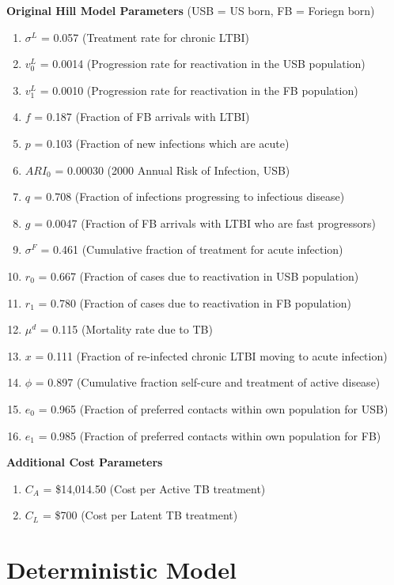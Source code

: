 \documentclass{article}[11pt]
\begin{document}
{\bf Original Hill Model Parameters}
(USB = US born, FB = Foriegn born)
\begin{enumerate} \itemsep 0em
\item{$\sigma^{L}$ = 0.057 (Treatment rate for chronic LTBI)}
\item{$v^{L}_{0}$   = 0.0014 (Progression rate for reactivation in the USB population)}
\item{$v^{L}_{1}$  = 0.0010 (Progression rate for reactivation in the FB population)}
\item{$f$                = 0.187 (Fraction of FB arrivals with LTBI)}
\item{$p$               = 0.103 (Fraction of new infections which are acute)}
\item{$ARI_{0}$     = 0.00030 (2000 Annual Risk of Infection, USB)}
\item{$q$               = 0.708 (Fraction of infections progressing to infectious disease)}
\item{$g$               = 0.0047 (Fraction of FB arrivals with LTBI who are fast progressors)}
\item{$\sigma^{F}$ = 0.461 (Cumulative fraction of treatment for acute infection)}
\item{$r_{0}$          = 0.667 (Fraction of cases due to reactivation in USB population)}
\item{$r_{1}$          = 0.780 (Fraction of cases due to reactivation in FB population)}
\item{$\mu^{d}$      = 0.115 (Mortality rate due to TB)}
\item{$x$                 = 0.111 (Fraction of re-infected chronic LTBI moving to acute infection)}
\item{$\phi$            = 0.897 (Cumulative fraction self-cure and treatment of active disease)}
\item{$e_{0}$          = 0.965 (Fraction of preferred contacts within own population for USB)}
\item{$e_{1}$          = 0.985 (Fraction of preferred contacts within own population for FB)}
\end{enumerate}
{\bf Additional Cost Parameters}
\begin{enumerate} \itemsep 0em
\item{$C_{A}$           = \$14,014.50 (Cost per Active TB treatment)}
\item{$C_{L}$           = \$700 (Cost per Latent TB treatment)}
\end{enumerate}

\section{Deterministic Model}
\end{document}
